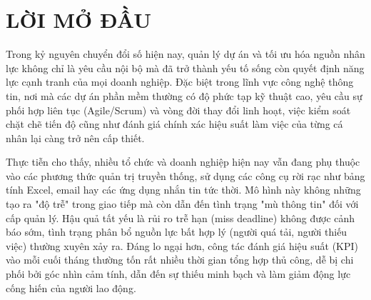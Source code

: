 \documentclass[a4paper,13.5pt]{extreport}
\begin{document}
\newpage

\renewcommand{\listfigurename}{DANH MỤC HÌNH ẢNH}
\listoffigures
{}

\newpage

\renewcommand{\listtablename}{DANH MỤC BẢNG BIỂU}
\listoftables
{}

\newpage

\renewcommand{\contentsname}{MỤC LỤC}
\tableofcontents
\newpage


\chapter*{LỜI MỞ ĐẦU}

Trong kỷ nguyên chuyển đổi số hiện nay, quản lý dự án và tối ưu hóa nguồn nhân lực không chỉ là yêu cầu nội bộ mà đã trở thành yếu tố sống còn quyết định năng lực cạnh tranh của mọi doanh nghiệp. Đặc biệt trong lĩnh vực công nghệ thông tin, nơi mà các dự án phần mềm thường có độ phức tạp kỹ thuật cao, yêu cầu sự phối hợp liên tục (Agile/Scrum) và vòng đời thay đổi linh hoạt, việc kiểm soát chặt chẽ tiến độ cũng như đánh giá chính xác hiệu suất làm việc của từng cá nhân lại càng trở nên cấp thiết.

Thực tiễn cho thấy, nhiều tổ chức và doanh nghiệp hiện nay vẫn đang phụ thuộc vào các phương thức quản trị truyền thống, sử dụng các công cụ rời rạc như bảng tính Excel, email hay các ứng dụng nhắn tin tức thời. Mô hình này không những tạo ra "độ trễ" trong giao tiếp mà còn dẫn đến tình trạng "mù thông tin" đối với cấp quản lý. Hậu quả tất yếu là rủi ro trễ hạn (miss deadline) không được cảnh báo sớm, tình trạng phân bổ nguồn lực bất hợp lý (người quá tải, người thiếu việc) thường xuyên xảy ra. Đáng lo ngại hơn, công tác đánh giá hiệu suất (KPI) vào mỗi cuối tháng thường tốn rất nhiều thời gian tổng hợp thủ công, dễ bị chi phối bởi góc nhìn cảm tính, dẫn đến sự thiếu minh bạch và làm giảm động lực cống hiến của người lao động.
\end{document}

